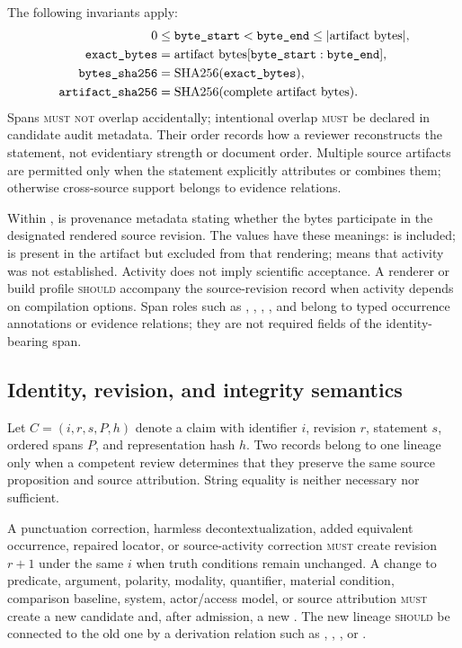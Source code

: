 The following invariants apply:
\begin{align*}
0 &\leq \texttt{byte\_start} < \texttt{byte\_end}
   \leq \lvert\text{artifact bytes}\rvert,\\
\texttt{exact\_bytes}
  &= \text{artifact bytes}[\texttt{byte\_start}:\texttt{byte\_end}],\\
\texttt{bytes\_sha256}
  &= \operatorname{SHA256}(\texttt{exact\_bytes}),\\
\texttt{artifact\_sha256}
  &= \operatorname{SHA256}(\text{complete artifact bytes}).
\end{align*}
Spans \textsc{must not} overlap accidentally; intentional overlap \textsc{must} be declared in candidate audit metadata. Their order records how a reviewer reconstructs the statement, not evidentiary strength or document order. Multiple source artifacts are permitted only when the statement explicitly attributes or combines them; otherwise cross-source support belongs to evidence relations.

Within \SourceSpan{},  is provenance metadata stating whether the bytes participate in the designated rendered source revision. The values have these meanings:  is included;  is present in the artifact but excluded from that rendering;  means that activity was not established. Activity does not imply scientific acceptance. A renderer or build profile \textsc{should} accompany the source-revision record when activity depends on compilation options. Span roles such as , , , , and  belong to typed occurrence annotations or evidence relations; they are not required fields of the identity-bearing span.

\subsection{Identity, revision, and integrity semantics}

Let $C=(i,r,s,P,h)$ denote a claim with identifier $i$, revision $r$, statement $s$, ordered spans $P$, and representation hash $h$. Two records belong to one lineage only when a competent review determines that they preserve the same source proposition and source attribution. String equality is neither necessary nor sufficient.

A punctuation correction, harmless decontextualization, added equivalent occurrence, repaired locator, or source-activity correction \textsc{must} create revision $r+1$ under the same $i$ when truth conditions remain unchanged. A change to predicate, argument, polarity, modality, quantifier, material condition, comparison baseline, system, actor/access model, or source attribution \textsc{must} create a new candidate and, after admission, a new . The new lineage \textsc{should} be connected to the old one by a derivation relation such as , , , or .

